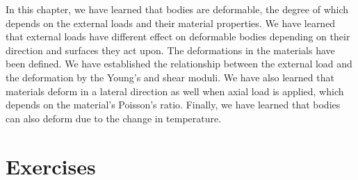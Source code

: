 \documentclass[
fontsize=10pt,
a4paper,
twosides=false,
open=any,
svgnames,
]{kaobook} %
\begin{document}
In this chapter, we have learned that bodies are deformable, the degree of which depends on the external loads and their material properties. We have learned that external loads have different effect on deformable bodies depending on their direction and surfaces they act upon. The deformations in the materials have been defined. We have established the relationship between the external load and the deformation by the Young’s and shear moduli. We have also learned that materials deform in a lateral direction as well when axial load is applied, which depends on the material’s Poisson’s ratio. Finally, we have learned that bodies can also deform due to the change in temperature.

\section*{Exercises}
\end{document}
